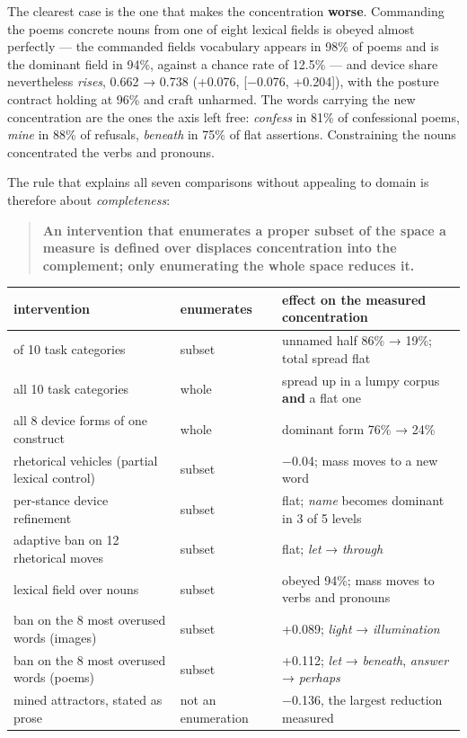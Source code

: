 \documentclass[
  10pt,
]{article}
\theoremstyle{plain}
\theoremstyle{definition}
\begin{document}
The clearest case is the one that makes the concentration
\textbf{worse}. Commanding the poem\textquotesingle s concrete nouns
from one of eight lexical fields is obeyed almost perfectly --- the
commanded field\textquotesingle s vocabulary appears in 98\% of poems
and is the dominant field in 94\%, against a chance rate of 12.5\% ---
and device share nevertheless \emph{rises}, 0.662 → 0.738 (+0.076,
{[}−0.076, +0.204{]}), with the posture contract holding at 96\% and
craft unharmed. The words carrying the new concentration are the ones
the axis left free: \emph{confess} in 81\% of confessional poems,
\emph{mine} in 88\% of refusals, \emph{beneath} in 75\% of flat
assertions. Constraining the nouns concentrated the verbs and pronouns.

The rule that explains all seven comparisons without appealing to domain
is therefore about \emph{completeness}:

\begin{quote}
\textbf{An intervention that enumerates a proper subset of the space a
measure is defined over displaces concentration into the complement;
only enumerating the whole space reduces it.}
\end{quote}

{\footnotesize
\begin{longtable}[]{@{}>{\raggedright\arraybackslash}p{}>{\raggedright\arraybackslash}p{}>{\raggedright\arraybackslash}p{}@{}}
\toprule\noalign{}
intervention & enumerates & effect on the measured concentration \\
\midrule\noalign{}
\endhead
\bottomrule\noalign{}
\endlastfoot
5 of 10 task categories & subset & unnamed half 86\% → 19\%; total
spread flat \\
all 10 task categories & whole & spread up in a lumpy corpus
\textbf{and} a flat one \\
all 8 device forms of one construct & whole & dominant form 76\% →
24\% \\
rhetorical vehicles (partial lexical control) & subset & −0.04; mass
moves to a new word \\
per-stance device refinement & subset & flat; \emph{name} becomes
dominant in 3 of 5 levels \\
adaptive ban on 12 rhetorical moves & subset & flat; \emph{let} →
\emph{through} \\
lexical field over nouns & subset & obeyed 94\%; mass moves to verbs and
pronouns \\
ban on the 8 most overused words (images) & subset & +0.089;
\emph{light} → \emph{illumination} \\
ban on the 8 most overused words (poems) & subset & +0.112; \emph{let} →
\emph{beneath}, \emph{answer} → \emph{perhaps} \\
mined attractors, stated as prose & not an enumeration & −0.136, the
largest reduction measured \\
\end{longtable}}
\end{document}
